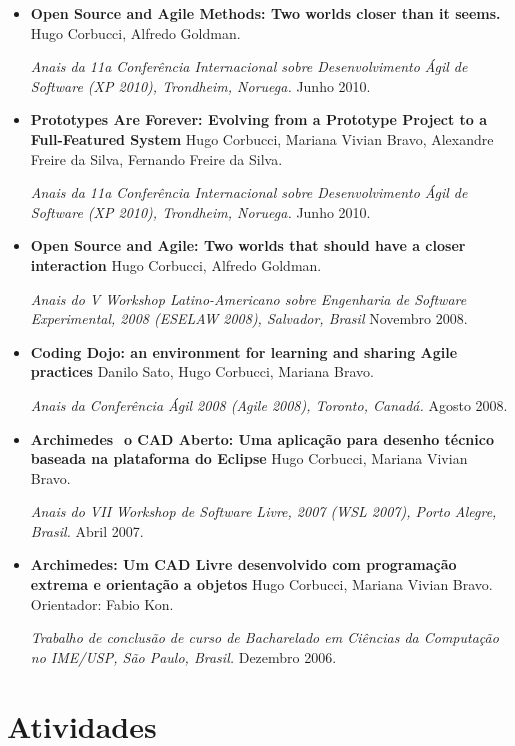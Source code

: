 \documentclass[letter,10pt]{article}
\begin{document}
\begin{itemize}
\item \textbf{Open Source and Agile Methods: Two worlds closer than it
    seems.} Hugo Corbucci, Alfredo Goldman.

  \textit{Anais da 11a Conferência Internacional sobre Desenvolvimento
    Ágil de Software (XP 2010), Trondheim, Noruega.} Junho 2010.

\item \textbf{Prototypes Are Forever: Evolving from a Prototype
    Project to a Full-Featured System} Hugo Corbucci, Mariana Vivian
  Bravo, Alexandre Freire da Silva, Fernando Freire da Silva.

  \textit{Anais da 11a Conferência Internacional sobre Desenvolvimento
    Ágil de Software (XP 2010), Trondheim, Noruega.} Junho 2010.

\item \textbf{Open Source and Agile: Two worlds that should have a
    closer interaction} Hugo Corbucci, Alfredo Goldman.

  \textit{Anais do V Workshop Latino-Americano sobre Engenharia de
    Software Experimental, 2008 (ESELAW 2008), Salvador, Brasil}
  Novembro 2008.

\item \textbf{Coding Dojo: an environment for learning and sharing
    Agile practices} Danilo Sato, Hugo Corbucci, Mariana Bravo.

  \textit{Anais da Conferência Ágil 2008 (Agile 2008), Toronto,
    Canadá.} Agosto 2008.

\item \textbf{Archimedes ­ o CAD Aberto: Uma aplicação para desenho
    técnico baseada na plataforma do Eclipse} Hugo Corbucci, Mariana
  Vivian Bravo.

  \textit{Anais do VII Workshop de Software Livre, 2007 (WSL 2007),
    Porto Alegre, Brasil.} Abril 2007.

\item \textbf{Archimedes: Um CAD Livre desenvolvido com programação
    extrema e orientação a objetos} Hugo Corbucci, Mariana Vivian
  Bravo. Orientador: Fabio Kon.

  \textit{Trabalho de conclusão de curso de Bacharelado em Ciências da
    Computação no IME/USP, São Paulo, Brasil.} Dezembro 2006.
\end{itemize}

\section{Atividades}
\end{document}
